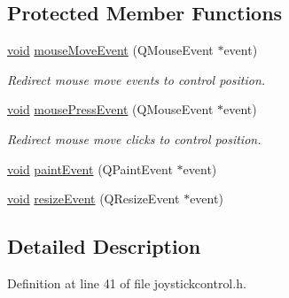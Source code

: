 \subsection*{Protected Member Functions}
\begin{DoxyCompactItemize}
\item 
\hyperlink{group___u_a_v_objects_plugin_ga444cf2ff3f0ecbe028adce838d373f5c}{void} \hyperlink{group___g_c_s_control_gadget_plugin_ga4522aafc5f2b7dae7d64ac4368189272}{mouse\-Move\-Event} (Q\-Mouse\-Event $\ast$event)
\begin{DoxyCompactList}\small\item\em Redirect mouse move events to control position. \end{DoxyCompactList}\item 
\hyperlink{group___u_a_v_objects_plugin_ga444cf2ff3f0ecbe028adce838d373f5c}{void} \hyperlink{group___g_c_s_control_gadget_plugin_ga8d3df6f8f57869a8e862f3844766ad72}{mouse\-Press\-Event} (Q\-Mouse\-Event $\ast$event)
\begin{DoxyCompactList}\small\item\em Redirect mouse move clicks to control position. \end{DoxyCompactList}\item 
\hyperlink{group___u_a_v_objects_plugin_ga444cf2ff3f0ecbe028adce838d373f5c}{void} \hyperlink{group___g_c_s_control_gadget_plugin_ga10ed4b7da97f80c638a3eec5a81344c8}{paint\-Event} (Q\-Paint\-Event $\ast$event)
\item 
\hyperlink{group___u_a_v_objects_plugin_ga444cf2ff3f0ecbe028adce838d373f5c}{void} \hyperlink{group___g_c_s_control_gadget_plugin_gaae12f9fa1f0456ecc47b044a2b2db9da}{resize\-Event} (Q\-Resize\-Event $\ast$event)
\end{DoxyCompactItemize}


\subsection{Detailed Description}


Definition at line 41 of file joystickcontrol.\-h.



